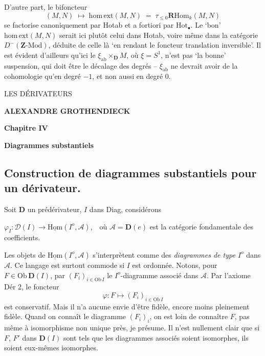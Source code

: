 \documentclass[11pt]{article}
\newcommand{\printedpage}[1]{\marginpar{\footnotesize p.~#1}}
\newcommand{\msp}[1]{\marginpar{\footnotesize [#1]}}
\newcommand{\Hot}{\mathrm{Hot}}
\newcommand{\D}{\mathbf{D}}
\newcommand{\uHom}{\underline{\mathrm{Hom}}}
\newcommand{\homext}{\mathrm{hom}\,\mathrm{ext}}
\newcommand{\RHom}{\mathbf{R}\mathrm{Hom}}
\newcommand{\ab}{\mathrm{ab}}
\newcommand{\cA}{\mathcal{A}}
\begin{document}
D’autre part, le bifoncteur
\[
(M,N)\;\longmapsto\;\homext(M,N)\;=\;\tau_{\le 0}\RHom_k(M,N)
\]
se factorise canoniquement par Hotab et a fortiori par $\Hot_{\bullet}$. Le ‘bon’ $\homext(M,N)$ serait ici plutôt celui dans Hotab, voire même dans la catégorie $D^{-}(\mathbf{Z}\text{-Mod})$, déduite de celle là ‘en rendant le foncteur translation inversible’. Il est évident d’ailleurs qu’ici le $\xi_{\ab}\times_{\D}M$, où $\xi=S^1$, n’est pas ‘la bonne’ suspension, qui doit être le décalage des degrés – $\xi_{\ab}$ ne devrait avoir de la cohomologie qu’en degré $-1$, et non aussi en degré $0$.

\printedpage{}%

\begin{center}
{\LARGE\textsf{LES DÉRIVATEURS}}

\bigskip

\textbf{ALEXANDRE GROTHENDIECK}

\bigskip\bigskip

\textbf{Chapitre IV}

\medskip

\textbf{Diagrammes substantiels}
\end{center}

\clearpage

\printedpage{}%


\clearpage

\printedpage{1}

\noindent

\msp{page 73}

\subsection*{Construction de diagrammes substantiels pour un dérivateur.}

\noindent Soit $\D$ un prédérivateur, $I$ dans Diag, considérons

\noindent $\varphi_I : \mathcal{D}(I) \longrightarrow \uHom(I^o,\cA)$,\ \ où $\cA=\D(e)$ est la catégorie fondamentale des coefficients. %

Les objets de $\uHom(I^o,\cA)$ s'interprètent comme des \textit{diagrammes de type $I^o$} dans $\cA$. Ce langage est surtout commode si $I$ est ordonnée. Notons, pour $F\in\mathrm{Ob}\,\D(I)$, par $(F_i)_{i\in\mathrm{Ob}\,I}$ le $I^o$-diagramme associé dans $\cA$. Par l'axiome Dér 2, le foncteur
\[
\varphi : F \longmapsto (F_i)_{i\in\mathrm{Ob}\,I}
\]
est conservatif. Mais il n'a aucune envie d'être fidèle, encore moins pleinement fidèle. Quand on connaît le diagramme $(F_i)_i$, on est loin de connaître $F$, pas même à isomorphisme non unique près, je présume. Il n'est nullement clair que si $F$, $F'$ dans $\D(I)$ sont tels que les diagrammes associés soient isomorphes, ils soient eux-mêmes isomorphes.
\end{document}

